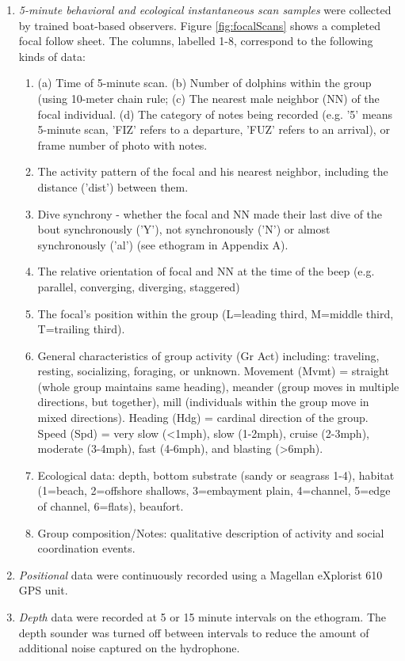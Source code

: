 \documentclass[11pt]{amsart}
\begin{document}
\begin{enumerate}[label*=\arabic*.]
\item \emph{5-minute behavioral and ecological instantaneous scan samples} \citep{altmann:1974} were collected by trained boat-based observers. Figure \ref{fig:focalScans} shows a completed focal follow sheet. The columns, labelled 1-8, correspond to the following kinds of data: 
\begin{enumerate}[label*=\arabic*.]
\item (a) Time of 5-minute scan. (b) Number of dolphins within the group (using 10-meter chain rule; \citep{smolker:1992} (c) The nearest male neighbor (NN) of the focal individual. (d) The category of notes being recorded (e.g. '5' means 5-minute scan, 'FIZ' refers to a departure, 'FUZ' refers to an arrival), or frame number of photo with notes. 
\item The activity pattern of the focal and his nearest neighbor, including the distance ('dist') between them.
\item Dive synchrony - whether the focal and NN made their last dive of the bout synchronously ('Y'), not synchronously ('N') or almost synchronously ('al') (see ethogram in Appendix A).
\item The relative orientation of focal and NN at the time of the beep (e.g. parallel, converging, diverging, staggered)
\item The focal's position within the group (L=leading third, M=middle third, T=trailing third). 
\item General characteristics of group activity (Gr Act) including: traveling, resting, socializing, foraging, or unknown. Movement (Mvmt) = straight (whole group maintains same heading), meander (group moves in multiple directions, but together), mill (individuals within the group move in mixed directions). Heading (Hdg) = cardinal direction of the group. Speed (Spd) = very slow (\textless1mph), slow (1-2mph), cruise (2-3mph), moderate (3-4mph), fast (4-6mph), and blasting (\textgreater6mph).  
\item Ecological data: depth, bottom substrate (sandy or seagrass 1-4), habitat (1=beach, 2=offshore shallows, 3=embayment plain, 4=channel, 5=edge of channel, 6=flats), beaufort. 
\item Group composition/Notes: qualitative description of activity and social coordination events.
\end{enumerate}

\item \emph{Positional} data were continuously recorded using a Magellan eXplorist 610 GPS unit.
\item \emph{Depth} data were recorded at 5 or 15 minute intervals on the ethogram. The depth sounder was turned off between intervals to reduce the amount of additional noise captured on the hydrophone.
\end{enumerate}
\end{document}

